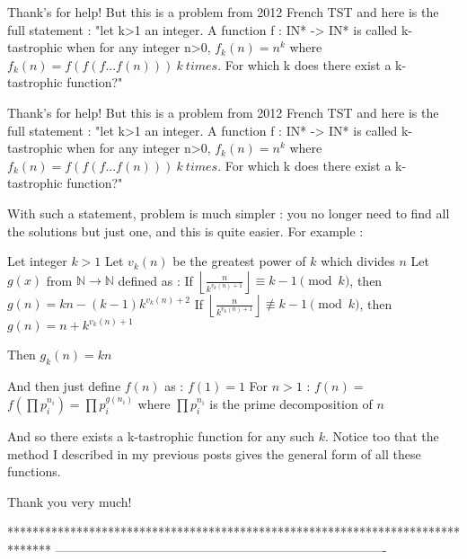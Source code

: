 \begin{solution}
	Thank's for help! 
But this is a problem from 2012 French TST and here is the full statement :
"let k>1 an integer. A function f : IN* -> IN* is called k-tastrophic when for any integer n>0, $f_{k}(n)=n^{k}$ where $f_{k}(n)=f(f(f...f(n))) \  k \ times$.
For which k does there exist a k-tastrophic function?"
\end{solution}



\begin{solution}
	\begin{tcolorbox}Thank's for help! 
But this is a problem from 2012 French TST and here is the full statement :
"let k>1 an integer. A function f : IN* -> IN* is called k-tastrophic when for any integer n>0, $f_{k}(n)=n^{k}$ where $f_{k}(n)=f(f(f...f(n))) \  k \ times$.
For which k does there exist a k-tastrophic function?"\end{tcolorbox}
With such a statement, problem is much simpler : you no longer need to find all the solutions but just one, and this is quite easier. For example :

Let integer $k>1$
Let $v_k(n)$ be the greatest power of $k$ which divides $n$
Let $g(x)$ from $\mathbb N\to\mathbb N$ defined as :
If $\left\lfloor\frac{n}{k^{v_k(n)+1}}\right\rfloor\equiv k-1\pmod k$, then $g(n)=kn-(k-1)k^{v_k(n)+2}$
If $\left\lfloor\frac{n}{k^{v_k(n)+1}}\right\rfloor\not\equiv k-1\pmod k$, then $g(n)=n+k^{v_k(n)+1}$

Then $g_k(n)=kn$

And then just define $f(n)$ as :
$f(1)=1$
For $n>1$ : $f(n)=$ $f\left(\prod p_i^{n_i}\right)=\prod p_i^{g(n_i)}$ where $\prod p_i^{n_i}$ is the prime decomposition of $n$

And so there exists a k-tastrophic function for any such $k$.
Notice too that the method I described in my previous posts gives the general form of all these functions.
\end{solution}



\begin{solution}
	Thank you very much!
\end{solution}
*******************************************************************************
-------------------------------------------------------------------------------


